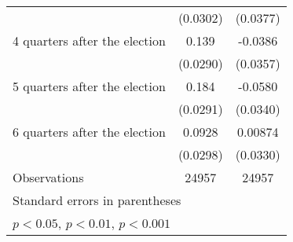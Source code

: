 \begin{table}[htbp]
\begin{tabular}{l*{2}{c}}
                    &    (0.0302)         &    (0.0377)         \\
[1em]
 4 quarters after the election&       0.139\sym{***}&     -0.0386         \\
                    &    (0.0290)         &    (0.0357)         \\
[1em]
 5 quarters after the election&       0.184\sym{***}&     -0.0580         \\
                    &    (0.0291)         &    (0.0340)         \\
[1em]
 6 quarters after the election&      0.0928\sym{**} &     0.00874         \\
                    &    (0.0298)         &    (0.0330)         \\
\hline
Observations        &       24957         &       24957         \\
\hline\hline
\multicolumn{3}{l}{\footnotesize Standard errors in parentheses}\\
\multicolumn{3}{l}{\footnotesize \sym{*} \(p<0.05\), \sym{**} \(p<0.01\), \sym{***} \(p<0.001\)}\\
\end{tabular}
\end{table}
